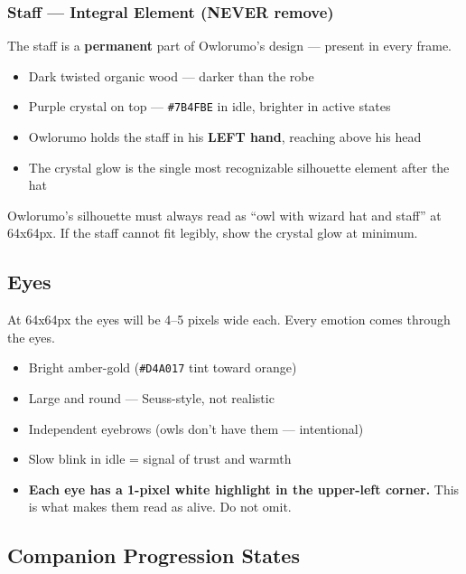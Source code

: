 \documentclass[11pt, a4paper]{article}
\newcommand{\hex}[1]{\textcolor[HTML]{#1}{\texttt{\##1}}}
\begin{document}
\subsubsection{Staff --- Integral Element (NEVER remove)}

The staff is a \textbf{permanent} part of Owlorumo's design --- present in every frame.

\begin{itemize}[leftmargin=1.5em, itemsep=2pt]
  \item Dark twisted organic wood --- darker than the robe
  \item Purple crystal on top --- \hex{7B4FBE} in idle, brighter in active states
  \item Owlorumo holds the staff in his \textbf{LEFT hand}, reaching above his head
  \item The crystal glow is the single most recognizable silhouette element after the hat
\end{itemize}

\begin{notebox}
  Owlorumo's silhouette must always read as ``owl with wizard hat and staff'' at 64x64px.
  If the staff cannot fit legibly, show the crystal glow at minimum.
\end{notebox}

\subsection{Eyes}

At 64x64px the eyes will be 4--5 pixels wide each. Every emotion comes through the eyes.

\begin{itemize}[leftmargin=1.5em, itemsep=2pt]
  \item Bright amber-gold (\hex{D4A017} tint toward orange)
  \item Large and round --- Seuss-style, not realistic
  \item Independent eyebrows (owls don't have them --- intentional)
  \item Slow blink in idle = signal of trust and warmth
  \item \textbf{Each eye has a 1-pixel white highlight in the upper-left corner.}
        This is what makes them read as alive. Do not omit.
\end{itemize}

\subsection{Companion Progression States}
\end{document}
